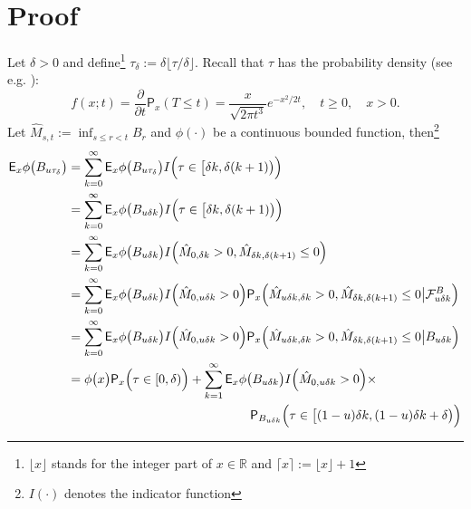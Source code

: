 \documentclass[reqno,10pt]{amsart}
\theoremstyle{definition}
\theoremstyle{remark}
\numberwithin{equation}{section}
\begin{document}
\section{Proof}
Let $\delta>0$ and define\footnote{$\lfloor x\rfloor$ stands for the integer part of $x\in{\mathbb R}$ and
$\lceil x\rceil:=\lfloor x \rfloor +1$}
$\tau_\delta := \delta\lfloor \tau/\delta\rfloor$.
Recall that $\tau$ has the  probability density (see e.g. \cite{BoSa96}):
\begin{equation}
\label{tauf}
f(x;t)=\frac {\partial}{\partial t}{\mathsf{P}}_x(T\le t)=\frac{x}{\sqrt{2\pi t^3}}e^{-x^2/2t},\quad t\ge 0, \quad x>0.
\end{equation}
Let $\hat M_{s,t}:=\inf_{s\le r<  t}B_r$ and $\phi(\cdot)$ be a  continuous bounded
function, then\footnote{$I(\cdot)$ denotes the indicator function}
\begin{align*}
{\mathsf{E}}_x \phi\big(B_{u\tau_\delta}\big)&=\sum_{k= 0}^\infty {\mathsf{E}}_x \phi\big(B_{u\tau_\delta}\big)
I\Big(\tau\in \big[\delta k, \delta(k+1)\big)\Big)\\
&=\sum_{k= 0}^\infty {\mathsf{E}}_x \phi\big(B_{u\delta k}\big)
I\Big(\tau\in \big[\delta k, \delta(k+1)\big)\Big)\\
&=
\sum_{k= 0}^\infty {\mathsf{E}}_x \phi\big(B_{u\delta k}\big)
I\Big(\hat M_{0,\delta k}>0, \hat M_{\delta k, \delta (k+1)}\le 0\Big)
\\
&=\sum_{k= 0}^\infty {\mathsf{E}}_x \phi\big(B_{u\delta k}\big)
I\Big(\hat M_{0,u\delta k}>0\Big){\mathsf{P}}_x\Big( \hat M_{u\delta k,\delta k}>0, \hat M_{\delta k, \delta (k+1)}\le 0\big|
{\mathcal{F}}^B_{u\delta k}
\Big)\\
&=\sum_{k= 0}^\infty {\mathsf{E}}_x \phi\big(B_{u\delta k}\big)
I\Big(\hat M_{0,u\delta k}>0\Big){\mathsf{P}}_x\Big( \hat M_{u\delta k,\delta k}>0, \hat M_{\delta k, \delta (k+1)}\le 0\big|
B_{u\delta k}
\Big)\\
&=\phi\big(x\big){\mathsf{P}}_{x}\Big(\tau\in [0, \delta )\Big)
+
\sum_{k= 1}^\infty {\mathsf{E}}_x \phi\big(B_{u\delta k}\big)
I\Big(\hat M_{0,u\delta k}>0\Big)\times \\
&\hskip 2.0in
{\mathsf{P}}_{B_{u\delta k}}\Big(\tau\in \big[(1-u)\delta k, (1-u)\delta k +\delta\big)\Big)
\end{align*}
\end{document}
